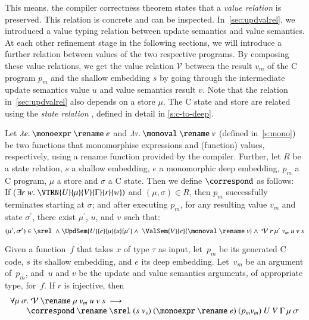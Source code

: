 \documentclass[9pt\ifFinal\else,preprint,nocopyrightspace\fi,\ifAlpha\else natbib,authoryear\fi]{sigplanconf}
\begin{document}
This means, the compiler correctness theorem states that a \emph{value
relation} is preserved. This relation is concrete and can be inspected.
In~\autoref{sec:updvalrel}, we introduced a value typing relation between
update semantics and value semantics. At each other refinement stage in the
following sections, we will introduce a further relation between values of
the two respective programs. By composing these value relations, we get the
value relation $\mathcal{V}$ between the result $v_m$ of the C program $p_m$
and the shallow embedding $s$ by going through the intermediate update
semantics value $u$ and value semantics result $v$. Note that the relation
in~\autoref{sec:updvalrel} also depends on a \CDSL store $\mu$. The C state
and \CDSL store are related using the \emph{state relation} \srel, defined in
detail in \autoref{s:c-to-deep}.

Let $\lambda e. \ \monoexpr \ \rename \ e$ and 
  $\lambda v. \ \monoval \ \rename \ v$ (defined in~\autoref{s:mono})
  be two functions
   that monomorphise expressions and (function) values, respectively,
   using a rename function \rename provided by the compiler.
Further, let 
   $R$ be a state relation, 
   $s$ a shallow embedding, 
   $e$ a monomorphic deep embedding, 
   $p_m$  a C program, $\mu$ a \CDSL store and $\sigma$ a  C state. 
    Then we define 
$\correspond$  as follows: \\
     If ($\exists r\;w.\;\VTRN{U}{\mu}{V}{\Gamma}{r}{w})$ and $(\mu, \sigma) \in R$, 
     then $p_m$ successfully terminates starting at $\sigma$; and 
     after executing $p_m$, for any resulting value $v_m$ and state $\sigma^\prime$, there exist $\mu^\prime$, $u$, and $v$ such that:
$$(\mu^\prime, \sigma^\prime) \in \srel \ \wedge 
    \UpdSem{U}{e}{\mu}{u}{\mu^\prime}\wedge \
    \ValSem{V}{e}{\monoval \ \rename \ v} \wedge \
       \mathcal{V} \  r \ \mu^\prime \ v_m\ u\ v \ s $$




\begin{theorem}
Given a \CDSL function~$f$ that takes $x$ of type $\tau$ as input, 
let~$p_m$ be its generated C code, 
$s$ its shallow embedding, and 
$e$ its deep embedding. 
Let~$v_m$ be an argument of~$p_m$, and~$u$ and $v$ be the update and value semantics arguments, of appropriate type, for~$f$. If $r$ is injective, then
\[
\begin{array}{l}
    \forall \mu\ \sigma.\ \mathcal{V} \ \rename \ \mu  \ v_m\ u\ v \ s \  \longrightarrow \\
   \quad\quad\correspond \ \rename \ \srel
     \  (s \; v_s) \ (\monoexpr \ \rename \ e) \ (p_m v_m)\ 
       U\  V\  \Gamma \ \mu \ \sigma
\end{array}
\]
\end{theorem}
\end{document}
